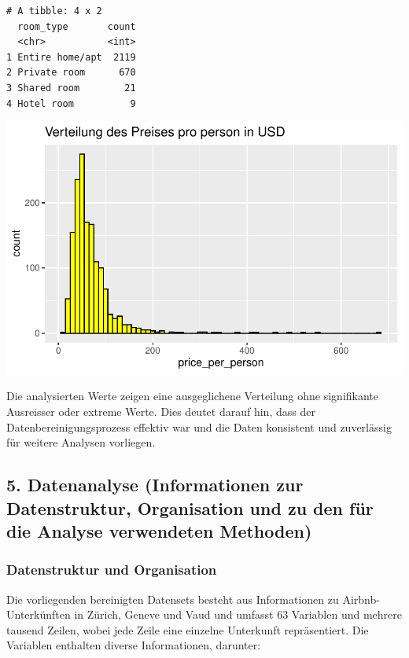 \documentclass[
  journal,
]{IEEEtran}%
\begin{document}
\begin{verbatim}
# A tibble: 4 x 2
  room_type       count
  <chr>           <int>
1 Entire home/apt  2119
2 Private room      670
3 Shared room        21
4 Hotel room          9
\end{verbatim}

\includegraphics{main_files/figure-pdf/eda price_per_person-1.pdf}

Die analysierten Werte zeigen eine ausgeglichene Verteilung ohne
signifikante Ausreisser oder extreme Werte. Dies deutet darauf hin, dass
der Datenbereinigungsprozess effektiv war und die Daten konsistent und
zuverlässig für weitere Analysen vorliegen.

\hypertarget{datenanalyse-informationen-zur-datenstruktur-organisation-und-zu-den-fuxfcr-die-analyse-verwendeten-methoden}{%
\subsection{5. Datenanalyse (Informationen zur Datenstruktur,
Organisation und zu den für die Analyse verwendeten
Methoden)}\label{datenanalyse-informationen-zur-datenstruktur-organisation-und-zu-den-fuxfcr-die-analyse-verwendeten-methoden}}

\hypertarget{datenstruktur-und-organisation}{%
\subsubsection{Datenstruktur und
Organisation}\label{datenstruktur-und-organisation}}

Die vorliegenden bereinigten Datensets besteht aus Informationen zu
Airbnb-Unterkünften in Zürich, Geneve und Vaud und umfasst 63 Variablen
und mehrere tausend Zeilen, wobei jede Zeile eine einzelne Unterkunft
repräsentiert. Die Variablen enthalten diverse Informationen, darunter:
\end{document}
